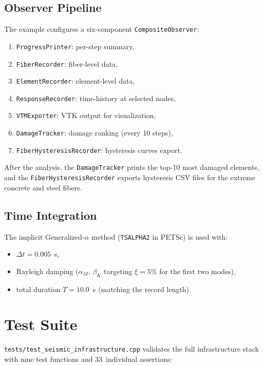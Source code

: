 \subsection{Observer Pipeline}

The example configures a six-component
\texttt{CompositeObserver}:
%
\begin{enumerate}
  \item \texttt{ProgressPrinter}: per-step summary,
  \item \texttt{FiberRecorder}: fiber-level data,
  \item \texttt{ElementRecorder}: element-level data,
  \item \texttt{ResponseRecorder}: time-history at selected nodes,
  \item \texttt{VTMExporter}: VTK output for visualization,
  \item \texttt{DamageTracker}: damage ranking (every 10 steps),
  \item \texttt{FiberHysteresisRecorder}: hysteresis curves export.
\end{enumerate}
%
After the analysis, the \texttt{DamageTracker} prints the top-10
most damaged elements, and the \texttt{FiberHysteresisRecorder}
exports hysteresis CSV files for the extreme concrete and steel
fibers.

\subsection{Time Integration}

The implicit Generalized-$\alpha$ method
(\texttt{TSALPHA2} in PETSc) is used with:
%
\begin{itemize}
  \item $\Delta t = 0.005$~s,
  \item Rayleigh damping ($\alpha_M$, $\beta_K$ targeting
    $\xi = 5\%$ for the first two modes),
  \item total duration $T = 10.0$~s (matching the record length).
\end{itemize}


\section{Test Suite}
\label{sec:seismic-tests}

\texttt{tests/test\_seismic\_infrastructure.cpp} validates the full
infrastructure stack with nine test functions and 33~individual
assertions:

